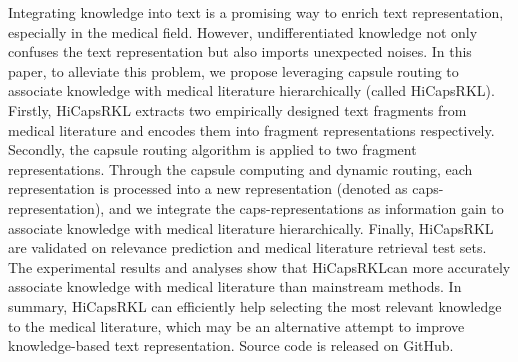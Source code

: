 Integrating knowledge into text is a promising way to enrich text representation, especially in the medical field. However, undifferentiated knowledge not only confuses the text representation but also imports unexpected noises. In this paper, to alleviate this problem, we propose leveraging capsule routing to associate knowledge with medical literature hierarchically (called HiCapsRKL). Firstly, HiCapsRKL extracts two empirically designed text fragments from medical literature and encodes them into fragment representations respectively. Secondly, the capsule routing algorithm is applied to two fragment representations. Through the capsule computing and dynamic routing, each representation is processed into a new representation (denoted as caps-representation), and we integrate the caps-representations as information gain to associate knowledge with medical literature hierarchically. Finally, HiCapsRKL are validated on relevance prediction and medical literature retrieval test sets. The experimental results and analyses show that HiCapsRKLcan more accurately associate knowledge with medical literature than mainstream methods. In summary, HiCapsRKL can efficiently help selecting the most relevant knowledge to the medical literature, which may be an alternative attempt to improve knowledge-based text representation. Source code is released on GitHub.
